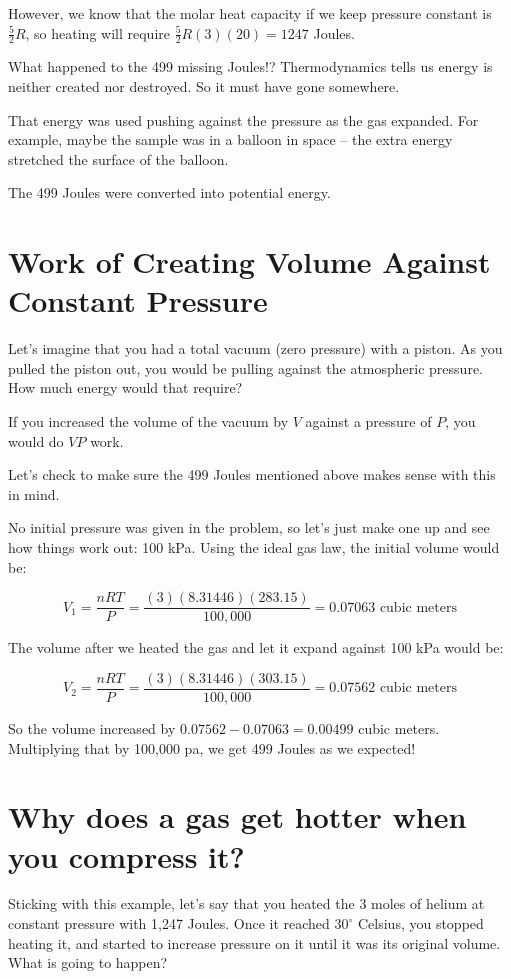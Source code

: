 However,  we know that the molar heat capacity if we keep pressure constant is $\frac{5}{2}R$,  so  heating will require $\frac{5}{2}R(3)(20) = 1247$ Joules.  

What happened to the 499 missing Joules!?  Thermodynamics tells us energy is neither created nor destroyed.  So it must have gone somewhere.

That energy was used pushing against the pressure as the gas expanded.  For example,  maybe the sample was in a balloon in space -- the extra energy stretched the surface of the balloon.  

The 499 Joules were converted into potential energy.   

\section{Work of Creating Volume Against Constant Pressure}

Let's imagine that you had a total vacuum (zero pressure) with a piston.  As you pulled the piston out,  you would be pulling against  the atmospheric pressure.  How much energy would that require?

If you increased the volume of the vacuum by $V$ against a pressure of $P$,   you would do $VP$ work.

Let's check to make sure the 499 Joules mentioned above makes sense with this in mind.

No initial pressure was given in the problem, so let's just make one up and see how things work out: 100 kPa.  Using the ideal gas law,  the initial volume would be:

$$V_1 = \frac{n R T}{P} = \frac{(3)(8.31446)(283.15)}{100,000} = 0.07063\text{ cubic meters}$$

The volume after we heated the gas and let it expand against 100 kPa would be:

$$V_2 = \frac{n R T}{P} = \frac{(3)(8.31446)(303.15)}{100,000} = 0.07562\text{ cubic meters}$$

So the volume increased by $0.07562 - 0.07063 = 0.00499$ cubic meters.   
Multiplying that by 100,000 pa, we get 499 Joules as we expected!

\section{Why does a gas get hotter when you compress it?}

Sticking with this example, let's say that you heated the 3 moles of helium at constant pressure with 1,247 Joules.  Once it reached $30^\circ$ Celsius, you stopped heating it, and started to increase pressure on it until it was its original volume.   What is going to happen?

